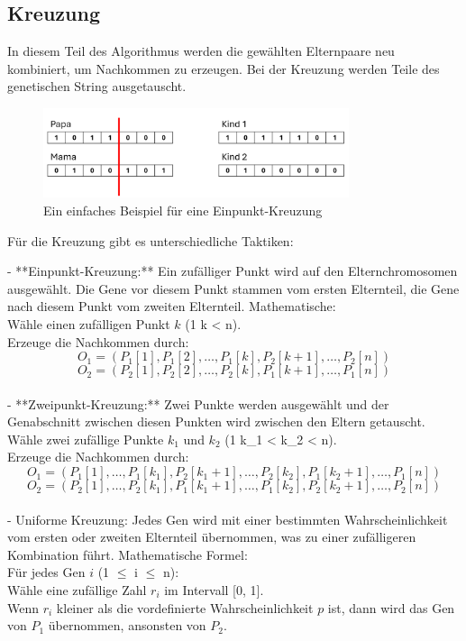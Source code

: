 %
%
%
%
\subsection{Kreuzung
	\label{genetic_algorithm:crossover}}
In diesem Teil des Algorithmus werden die gewählten Elternpaare 
neu kombiniert, um Nachkommen zu erzeugen. Bei der Kreuzung 
werden Teile des genetischen String ausgetauscht.

\begin{figure} [h]
	\centering
	\includegraphics[width=0.8\textwidth]{
		papers/variationsprinzip_algorithmen/images/teil3/05_genetic_string_cross.png
	}
	\caption{Ein einfaches Beispiel für eine Einpunkt-Kreuzung}
	\label{fig:one_point_crossover}
\end{figure}

Für die Kreuzung gibt es unterschiedliche Taktiken:

- **Einpunkt-Kreuzung:** Ein zufälliger Punkt wird auf den 
Elternchromosomen ausgewählt. Die Gene vor diesem Punkt 
stammen vom ersten Elternteil, die Gene nach diesem Punkt 
vom zweiten Elternteil. Mathematische:\\
Wähle einen zufälligen Punkt \( k \) (1 \leq k < n).\\
Erzeuge die Nachkommen durch:
\[ O_1 = (P_1[1], P_1[2], \ldots, P_1[k], P_2[k+1], \ldots, P_2[n]) \]
\[ O_2 = (P_2[1], P_2[2], \ldots, P_2[k], P_1[k+1], \ldots, P_1[n]) \]
\\
- **Zweipunkt-Kreuzung:** Zwei Punkte werden ausgewählt und 
der Genabschnitt zwischen diesen Punkten wird zwischen 
den Eltern getauscht.\\
Wähle zwei zufällige Punkte \( k_1 \) und \( k_2 \) (1 \leq k_1 < k_2 < n).\\
Erzeuge die Nachkommen durch:
\[
O_1 = (P_1[1], \ldots, P_1[k_1], P_2[k_1+1], \ldots, P_2[k_2], P_1[k_2+1], \ldots, P_1[n])
\]
\[
O_2 = (P_2[1], \ldots, P_2[k_1], P_1[k_1+1], \ldots, P_1[k_2], P_2[k_2+1], \ldots, P_2[n])
\]
\\
- Uniforme Kreuzung: Jedes Gen wird mit einer bestimmten 
Wahrscheinlichkeit vom ersten oder zweiten Elternteil 
übernommen, was zu einer zufälligeren Kombination führt.
Mathematische Formel:\\
Für jedes Gen \( i \) (1 \(\leq\) i \(\leq\) n):\\
Wähle eine zufällige Zahl \( r_i \) im Intervall [0, 1].\\
Wenn \( r_i \) kleiner als die vordefinierte Wahrscheinlichkeit 
\( p \) ist, dann wird das Gen von \( P_1 \) übernommen, 
ansonsten von \( P_2 \).

